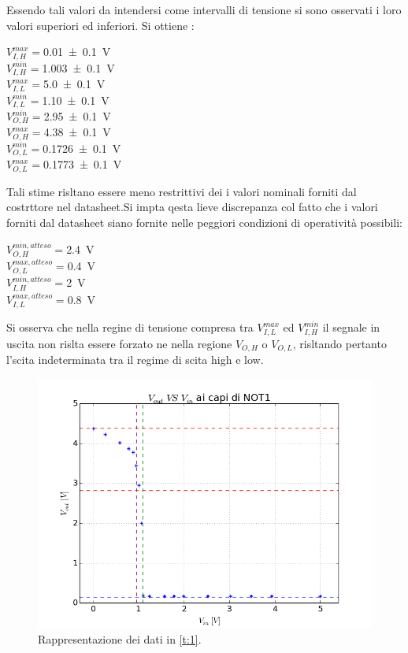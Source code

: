 	 Essendo tali valori da intendersi come intervalli di tensione si sono osservati i loro valori superiori ed inferiori.
	 Si ottiene :
	 \begin{center}
	 $V_{I,H}^{max}=$\SI{0.01 \pm 0.1}{\volt} \\
	 $V_{I,H}^{min}=$\SI{1.003 \pm 0.1}{\volt}\\
	 $V_{I,L}^{max}=$\SI{5.0 \pm 0.1}{\volt}\\
	 $V_{I,L}^{min}=$\SI{1.10 \pm 0.1}{\volt}\\

	 $V_{O,H}^{min}=$\SI{2.95 \pm 0.1}{\volt}\\
	 $V_{O,H}^{max}=$\SI{4.38 \pm 0.1}{\volt}\\
	 $V_{O,L}^{min}=$\SI{0.1726 \pm 0.1}{\volt}\\
	 $V_{O,L}^{max}=$\SI{0.1773 \pm 0.1}{\volt}	\\
	 \end{center}

	 Tali stime risltano essere meno restrittivi dei i valori
	 nominali forniti dal costrttore nel datasheet.Si impta qesta lieve discrepanza
	 col fatto che i valori forniti dal datasheet siano fornite nelle peggiori condizioni di operatività possibili:
	 \begin{center}

	 	$V_{O,H}^{min,atteso}=$\SI{2.4}{\volt}\\
	 	$V_{O,L}^{max,atteso}=$\SI{0.4}{\volt}\\
	 $V_{I,H}^{min,atteso}=$\SI{2}{\volt}\\
	 $V_{I,L}^{max,atteso}=$\SI{0.8}{\volt}\\
 \end{center}
	 Si osserva che nella regine di tensione compresa tra 	$V_{I,L}^{max}$ ed $V_{I,H}^{min}$ il segnale in uscita non rislta essere forzato ne nella regione $V_{O,H}$ o $V_{O,L}$, risltando pertanto  l'scita indeterminata tra il regime di scita high e low.
	\begin{figure}[h]
		\centering
		\includegraphics[scale=0.50]{../immagine/in-ot.png}
		\caption{Rappresentazione dei dati in \tablename{ \ref{t:1}}.}
		\label{f:i1}
	\end{figure}



